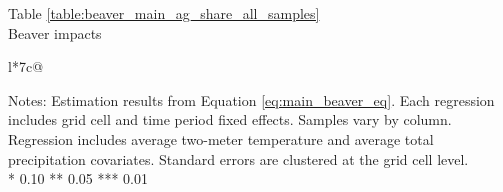\begin{table}[htb]
\captionlistentry[table]{}
\label{table:beaver_main_ag_share_all_samples}
\centering
Table \ref{table:beaver_main_ag_share_all_samples} \\
Beaver impacts \\
\begin{threeparttable}
\begin{tabulary}{\textwidth}{l*{7}{c}@{}}
\toprule \toprule
\noalign{\smallskip}
\noalign{\smallskip}
\midrule \bottomrule
\end{tabulary}
\medskip
\begin{tablenotes}[flushleft]
\setlength{}
\item
\footnotesize
\justify
Notes: Estimation results from Equation \eqref{eq:main_beaver_eq}.
Each regression includes grid cell and time period fixed effects.
Samples vary by column. Regression includes average two-meter temperature and average total precipitation covariates.
Standard errors are clustered at the grid cell level.  \\
\mbox{*} 0.10 ** 0.05 *** 0.01
\end{tablenotes}
\end{threeparttable}
\end{table}
